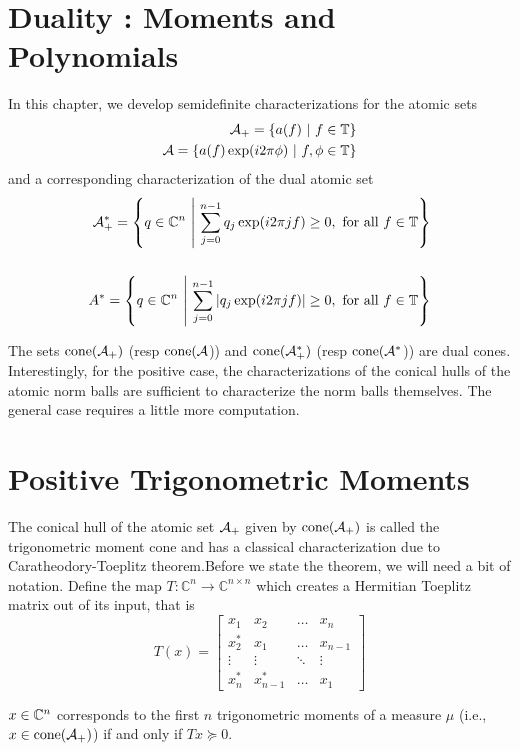 \section{Duality : Moments and Polynomials}
In this chapter, we develop semidefinite characterizations for the atomic sets
\begin{align}
\mathcal{A}_+ = \left\{ a(f) ~\middle|~ f \in \mathbb{T} \right\}\\
\mathcal{A} = \left\{ a(f) \exp(i 2\pi \phi) ~\middle|~ f, \phi \in \mathbb{T} \right\}
\end{align}
and a corresponding characterization of the dual atomic set
\begin{align}
\mathcal{A}^*_+ = \left\{ q \in \mathbb{C}^n ~\middle|~ \sum_{j=0}^{n-1}{q_j \exp(i 2\pi j f)} \geq 0, \text{ for all } f \in \mathbb{T} \right\}\\
\\A^* = \left\{ q \in \mathbb{C}^n ~\middle|~ \sum_{j=0}^{n-1}{|q_j \exp(i 2\pi j f)|} \geq 0, \text{ for all } f \in \mathbb{T} \right\}
\end{align}

The sets $\operatorname{cone}(\mathcal{A}_+)$ (resp $\operatorname{cone}(\mathcal{A}$)) and $\operatorname{cone}(\mathcal{A}^*_+)$ (resp
$\operatorname{cone}(\mathcal{A}^*$)) are dual cones. Interestingly, for the positive case, the
characterizations of the conical hulls of the atomic norm balls are sufficient
to characterize the norm balls themselves. The general case requires a little
more computation.

\section{Positive Trigonometric Moments}

The conical hull of the atomic set $\mathcal{A}_+$ given by $\operatorname{cone}(\mathcal{A}_+)$ is called the
trigonometric moment cone and has a classical characterization due to
Caratheodory-Toeplitz theorem.Before we state the theorem, we will need a bit of
notation. Define the map $T:\mathbb{C}^n \rightarrow \mathbb{C}^{n\times n}$
which creates a Hermitian Toeplitz matrix out of its input, that is
\[
T(x)= \left[
\begin{array}{ccccc} x_1 & x_2 & \ldots & x_n\\ 
x^*_2 & x_1  & \ldots & x_{n-1}\\
 \vdots & \vdots & \ddots & \vdots\\
 x^*_n & x^*_{n-1}  & \ldots & x_1
 \end{array}\right]
\]

\begin{theorem}
	$x \in \mathbb{C}^n$ corresponds to the first $n$ trigonometric moments of a measure $\mu$ (i.e., $x \in \operatorname{cone}(\mathcal{A}_+)$) if and only if $T x \succeq 0.$
\end{theorem}

